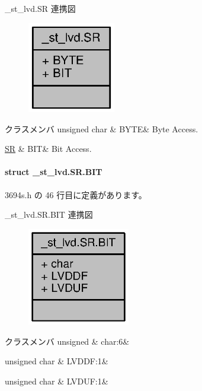 \+\_\+st\+\_\+lvd.\+S\+R 連携図
\nopagebreak
\begin{figure}[H]
\begin{center}
\leavevmode
\includegraphics[width=109pt]{d3/dca/union__st__lvd_8SR__coll__graph}
\end{center}
\end{figure}
\begin{DoxyFields}{クラスメンバ}
unsigned char\label{3694s_8h_ae409eb2ba6eb6801f52763ae370c350e}
&
B\+Y\+T\+E&
Byte Access. \\
\hline

\hyperlink{3694s_8h_db/d62/struct__st__lvd_8SR_8BIT}{S\+R}\label{3694s_8h_adb957fdc8000e1eef04a243f5199aa52}
&
B\+I\+T&
Bit Access. \\
\hline

\end{DoxyFields}
\label{struct__st__lvd_8SR_8BIT}
\paragraph{struct \+\_\+st\+\_\+lvd.\+S\+R.\+B\+I\+T}


 3694s.\+h の 46 行目に定義があります。



\+\_\+st\+\_\+lvd.\+S\+R.\+B\+I\+T 連携図
\nopagebreak
\begin{figure}[H]
\begin{center}
\leavevmode
\includegraphics[width=127pt]{d5/dc9/struct__st__lvd_8SR_8BIT__coll__graph}
\end{center}
\end{figure}
\begin{DoxyFields}{クラスメンバ}
unsigned\label{3694s_8h_aa87deb01c5f539e6bda34829c8ef2368}
&
char\+:6&
\\
\hline

unsigned char\label{3694s_8h_a0dacb9df2f1a92892ab069f9f0875697}
&
L\+V\+D\+D\+F\+:1&
\\
\hline

unsigned char\label{3694s_8h_aa10f93fb7c692cd00be61474fcd8b9c7}
&
L\+V\+D\+U\+F\+:1&
\\
\hline

\end{DoxyFields}
\label{union__st__iic2_8ICCR1}
